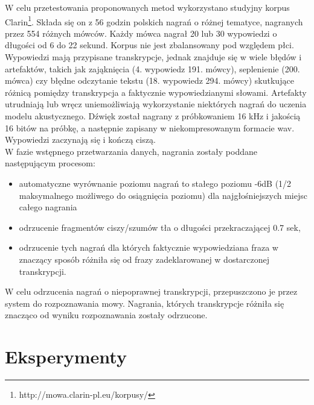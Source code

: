 \documentclass[11pt]{article}
\begin{document}
	W celu przetestowania proponowanych metod wykorzystano studyjny korpus Clarin\footnote{http://mowa.clarin-pl.eu/korpusy/}. Składa się on z 56 godzin polskich nagrań o różnej tematyce, nagranych przez 554 różnych mówców. Każdy mówca nagrał 20 lub 30 wypowiedzi o długości od 6 do 22 sekund. Korpus nie jest zbalansowany pod względem płci. Wypowiedzi mają przypisane transkrypcje, jednak znajduje się w wiele błędów i artefaktów, takich jak zająknięcia (4. wypowiedz 191. mówcy), seplenienie (200. mówca) czy błędne odczytanie tekstu (18. wypowiedz 294. mówcy) skutkujące różnicą pomiędzy transkrypcja a faktycznie wypowiedzianymi słowami. Artefakty utrudniają lub wręcz uniemożliwiają wykorzystanie niektórych nagrań do uczenia modelu akustycznego. Dźwięk został nagrany z próbkowaniem 16 kHz i jakością 16 bitów na próbkę, a następnie zapisany w niekompresowanym formacie wav. Wypowiedzi zaczynają się i kończą ciszą. 
\\
W fazie wstępnego przetwarzania danych, nagrania zostały poddane następującym procesom:
\begin{itemize}
	\item automatyczne wyrównanie poziomu nagrań to stałego poziomu -6dB (1/2 maksymalnego możliwego do osiągnięcia poziomu) dla najgłośniejszych miejsc całego nagrania
	\item odrzucenie fragmentów ciszy/szumów tła o długości przekraczającej 0.7 sek,
	\item odrzucenie tych nagrań dla których faktycznie wypowiedziana fraza w znaczący sposób różniła się od frazy zadeklarowanej w dostarczonej transkrypcji.
\end{itemize}
W celu odrzucenia nagrań o niepoprawnej transkrypcji, przepuszczono je przez system do rozpoznawania mowy. Nagrania, których transkrypcje różniła się znacząco od wyniku rozpoznawania zostały odrzucone.

\section{Eksperymenty}
\label{sec:experiments}
\end{document}
